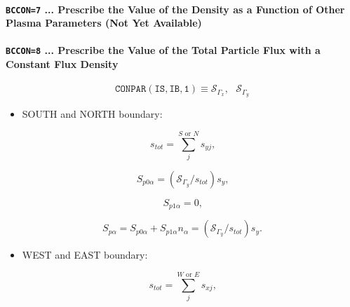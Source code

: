 \documentclass[11pt]{article}
\begin{document}
\bigskip

\paragraph{\texttt{BCCON=7} ... Prescribe the Value of the Density as a
Function of Other Plasma Parameters (Not Yet Available)}

\bigskip

\bigskip

\paragraph{\texttt{BCCON=8} ... Prescribe the Value of the Total Particle
Flux with a Constant Flux Density}

\bigskip

\begin{equation*}
\mathtt{CONPAR(IS,IB,1)}\equiv\mathcal{S}_{\Gamma_{x}},\text{ }\mathcal{S}%
_{\Gamma_{y}}
\end{equation*}

\bigskip

\begin{itemize}
\item  SOUTH and NORTH boundary:
\end{itemize}

\begin{equation}
s_{tot}=\sum_{j}^{S\text{ or }N}s_{yj}\text{,}   \label{c49}
\end{equation}

\begin{equation}
S_{p0\alpha}=\left( \mathcal{S}_{\Gamma_{y}}/s_{tot}\right) s_{y}\text{,} 
\label{c50}
\end{equation}

\begin{equation}
S_{p1\alpha}=0\text{,}   \label{c51}
\end{equation}

\begin{equation}
S_{p\alpha}=S_{p0\alpha}+S_{p1\alpha}n_{\alpha}=\left( \mathcal{S}%
_{\Gamma_{y}}/s_{tot}\right) s_{y}\text{.}   \label{c52}
\end{equation}

\begin{itemize}
\item  WEST and EAST boundary:
\end{itemize}

\begin{equation}
s_{tot}=\sum_{j}^{W\text{ or }E}s_{xj}\text{,}   \label{c53}
\end{equation}
\end{document}
